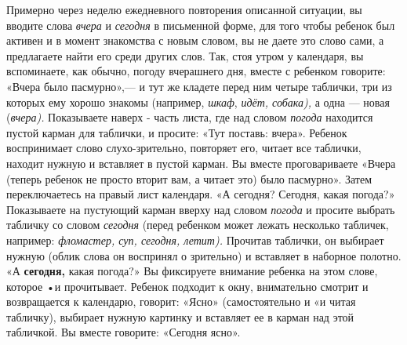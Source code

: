 \documentclass{book}
\renewcommand{\emph}[1]{\textit{#1}}
\begin{document}
Примерно через неделю ежедневного повторения описанной ситуации, вы
вводите слова \emph{вчера} и \emph{сегодня} в письменной форме, для того
чтобы ребенок был активен и в момент знакомства с новым словом, вы не
даете это слово сами, а предлагаете найти его среди других слов. Так,
стоя утром у календаря, вы вспоминаете, как обычно, погоду вчерашнего
дня, вместе с ребенком говорите: «Вчера было пасмурно»,--- и тут же
кладете перед ним четыре таблички, три из которых ему хорошо знакомы
(например, \emph{шкаф}, \emph{идёт, собака),} а одна --- новая
(\emph{вчера).} Показываете наверх - часть листа, где над словом
\emph{погода} находится пустой карман для таблички, и просите: «Тут
поставь: вчера». Ребенок воспринимает слово слухо-зрительно, повторяет
его, читает все таблички, находит нужную и вставляет в пустой карман. Вы
вместе проговариваете «Вчера (теперь ребенок не просто вторит вам, а
читает это) было пасмурно». Затем переключаетесь на правый лист
календаря. «А сегодня? Сегодня, какая погода?» Показываете на пустующий
карман вверху над словом \emph{погода} и просите выбрать табличку со
словом \emph{сегодня} (перед ребенком может лежать несколько табличек,
например: \emph{фломастер, суп, сегодня, летит).} Прочитав таблички, он
выбирает нужную (облик слова он воспринял о зрительно) и вставляет в
наборное полотно. «А \textbf{сегодня,} какая погода?» Вы фиксируете
внимание ребенка на этом слове, которое •и прочитывает. Ребенок подходит
к окну, внимательно смотрит и возвращается к календарю, говорит: «Ясно»
(самостоятельно и «и читая табличку), выбирает нужную картинку и
вставляет ее в карман над этой табличкой. Вы вместе говорите: «Сегодня
ясно».
\end{document}
